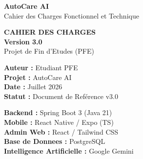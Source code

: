 \documentclass[11pt,a4paper]{report}
\begin{document}
\begin{titlepage}
    \centering
    
    \vspace{0.5cm}
    {\Huge \bfseries \color{white} AutoCare AI} \\[0.4cm]
    {\Large \color{accentBlue} Cahier des Charges Fonctionnel et Technique} \\[2.5cm]
    
    \begin{tcolorbox}[colback=white,colframe=primaryBlue,arc=4mm,boxrule=1.5pt,halign=center]
        \vspace{0.3cm}
        {\Huge \bfseries \color{primaryBlue} CAHIER DES CHARGES} \\[0.3cm]
        {\Large \bfseries \color{secondaryBlue} Version 3.0} \\[0.2cm]
        {\small \color{darkGray} Projet de Fin d'Etudes (PFE)}
        \vspace{0.3cm}
    \end{tcolorbox}
    
    \vfill
    
    \begin{minipage}{0.48\textwidth}
        \begin{techBox}
            \textbf{Auteur :} Etudiant PFE \\
            \textbf{Projet :} AutoCare AI \\
            \textbf{Date :} Juillet 2026 \\
            \textbf{Statut :} Document de Ref\'erence v3.0
        \end{techBox}
    \end{minipage}
    \hfill
    \begin{minipage}{0.48\textwidth}
        \begin{techBox}
            \textbf{Backend :} Spring Boot 3 (Java 21) \\
            \textbf{Mobile :} React Native / Expo (TS) \\
            \textbf{Admin Web :} React / Tailwind CSS \\
            \textbf{Base de Donnees :} PostgreSQL \\
            \textbf{Intelligence Artificielle :} Google Gemini
        \end{techBox}
    \end{minipage}
    

\end{titlepage}
\end{document}
